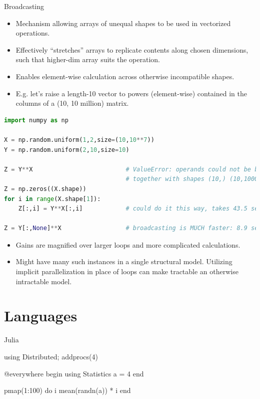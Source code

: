 \documentclass[aspectratio=1610,handout]{beamer}
\begin{document}
\begin{frame}{Broadcasting}
    \begin{itemize}
        \item Mechanism allowing arrays of unequal shapes to be used in vectorized operations.
        \item Effectively ``stretches'' arrays to replicate contents along chosen dimensions, such that higher-dim array suits the operation.
        \item Enables element-wise calculation across otherwise incompatible shapes.
        \item E.g. let's raise a length-10 vector to powers (element-wise) contained in the columns of a (10, 10 million) matrix.
        \end{itemize}
        
        \newpage
        
        \begin{lstlisting}[language=Python]
import numpy as np

X = np.random.uniform(1,2,size=(10,10**7))
Y = np.random.uniform(2,10,size=10)

Z = Y**X                          # ValueError: operands could not be broadcast  
                                  # together with shapes (10,) (10,10000000)
Z = np.zeros((X.shape))
for i in range(X.shape[1]):
    Z[:,i] = Y**X[:,i]            # could do it this way, takes 43.5 seconds

Z = Y[:,None]**X                  # broadcasting is MUCH faster: 8.9 seconds
        \end{lstlisting}
    \begin{itemize}
        \item Gains are magnified over larger loops and more complicated calculations.
        \item Might have many such instances in a single structural model.  Utilizing implicit parallelization in place of loops can make tractable an otherwise intractable model.
    \end{itemize}
\end{frame}

\section{Languages}

\begin{frame}[fragile]{Julia}
    \begin{jllisting}
using Distributed; addprocs(4)

@everywhere begin
    using Statistics
    a = 4
end

pmap(1:100) do i
    mean(randn(a)) * i
end
    \end{jllisting}
\end{frame}
\end{document}
